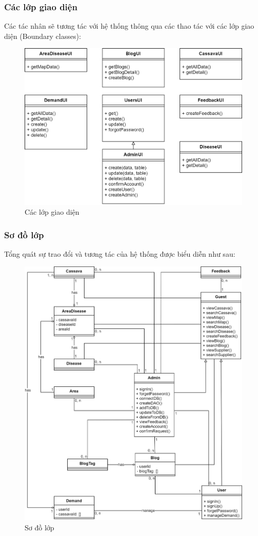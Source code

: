 \documentclass[./../main.tex]{subfiles}
\begin{document}
\subsubsection{Các lớp giao diện}
Các tác nhân sẽ tương tác với hệ thống thông qua các thao tác với các lớp giao diện (Boundary classes):
\begin{figure}[H]
	\centering
	\includegraphics[width=\linewidth]{./img/boundary.png}
	\caption{Các lớp giao diện}
\end{figure}

\subsubsection{Sơ đồ lớp}
Tổng quát sự trao đổi và tương tác của hệ thống được biểu diễn như sau:
\begin{figure}[H]
	\centering
	\includegraphics[width=\linewidth]{./img/classes.png}
	\caption{Sơ đồ lớp}
\end{figure}
\end{document}
